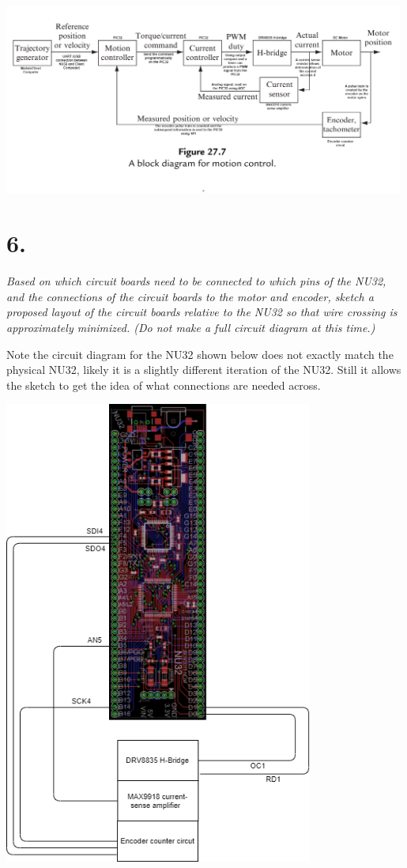 \documentclass[12pt]{article}
\begin{document}
\begin{center}
    \includegraphics[width=5.2in]{fig27_7_labelled.png}
\end{center}

\section*{6.}
\textit{Based on which circuit boards need to be connected to which pins of the NU32, and the connections of the circuit boards to the motor and encoder, sketch a proposed layout of the circuit boards relative to the NU32 so that wire crossing is approximately minimized. (Do not make a full circuit diagram at this time.)}

Note the circuit diagram for the NU32 shown below does not exactly match the physical NU32, likely it is a slightly different iteration of the NU32. 
Still it allows the sketch to get the idea of what connections are needed across.

\begin{center}
    \includegraphics[width=4in]{circuit_sketch.png}
\end{center}
\end{document}
